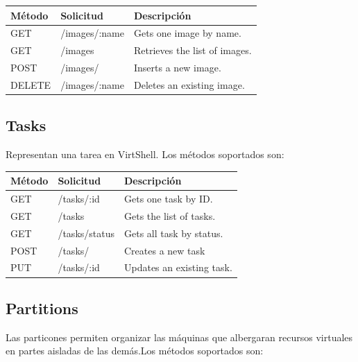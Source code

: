 \documentclass[conference, spanish]{IEEEtran}
\begin{document}
\begin{center}
 \begin{tabular}{| l | l | l |}
 \hline
  \textbf{Método} & \textbf{Solicitud} & \textbf{Descripción} \\ [0.5ex] 
  \hline\hline
  GET & /images/:name & Gets one image by name. \\
  \hline
  GET & /images & Retrieves the list of images. \\
  \hline  
  POST & /images/ & Inserts a new image. \\
  \hline
  DELETE & /images/:name & Deletes an existing image. \\ [1ex] 
  \hline
\end{tabular}
\end{center}

\subsection{Tasks}
Representan una tarea en VirtShell. Los métodos soportados son:

\begin{center}
 \small
 \begin{tabular}{| l | l | l |}
 \hline
  \textbf{Método} & \textbf{Solicitud} & \textbf{Descripción} \\ [0.5ex] 
  \hline\hline
  GET & /tasks/:id & Gets one task by ID. \\
  \hline
  GET & /tasks & Gets the list of tasks. \\
  \hline
  GET & /tasks/status & Gets all task by status. \\
  \hline 
  POST & /tasks/ & Creates a new task \\
  \hline  
  PUT & /tasks/:id & Updates an existing task. \\ [1ex] 
  \hline
\end{tabular}
\end{center}

\subsection{Partitions}
Las particones permiten organizar las máquinas que albergaran recursos virtuales en partes aisladas de las demás.Los métodos soportados son:
\end{document}
